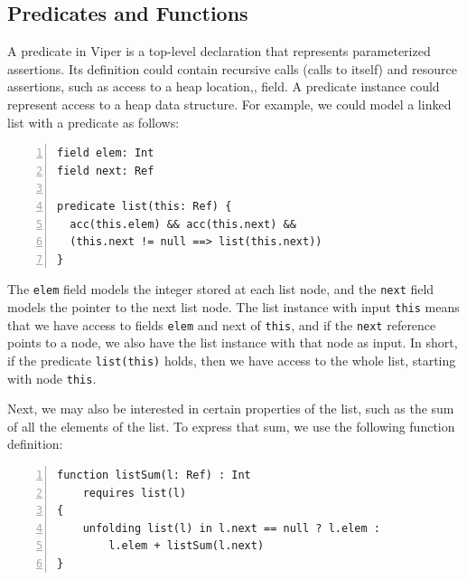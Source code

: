 \documentclass[msc,oneside]{ubcthesis}
\begin{document}


\subsection{Predicates and Functions}

A predicate in Viper is a top-level declaration that represents parameterized assertions. Its definition could contain recursive calls (calls to itself) and resource assertions, such as access to a heap location,\ie, field. A predicate instance could represent access to a heap data structure. For example, we could model a linked list with a predicate as follows:

\begin{lstlisting}[language=silver,numbers=left, firstnumber=1, stepnumber=1]
field elem: Int
field next: Ref

predicate list(this: Ref) {
  acc(this.elem) && acc(this.next) &&
  (this.next != null ==> list(this.next))
}
\end{lstlisting}

The \lstinline|elem| field models the integer stored at each list node, and the \lstinline|next| field models the pointer to the next list node. The list instance with input \lstinline|this| means that we have access to fields \lstinline|elem| and next of \lstinline|this|, and if the \lstinline|next| reference points to a node, we also have the list instance with that node as input. In short, if the predicate \lstinline|list(this)| holds, then we have access to the whole list, starting with node \lstinline|this|. 

Next, we may also be interested in certain properties of the list, such as the sum of all the elements of the list. To express that sum, we use the following function definition:

\begin{lstlisting}[language=silver,numbers=left, firstnumber=1, stepnumber=1]
function listSum(l: Ref) : Int
    requires list(l)
{
    unfolding list(l) in l.next == null ? l.elem : 
        l.elem + listSum(l.next)
}
\end{lstlisting}
\end{document}

